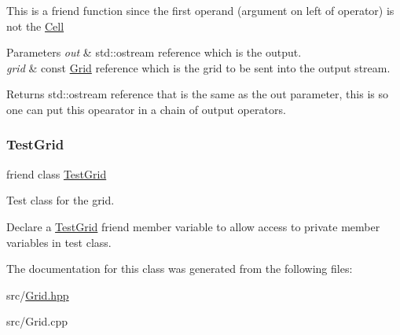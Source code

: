 This is a friend function since the first operand (argument on left of operator) is not the \hyperlink{class_cell}{Cell}


\begin{DoxyParams}{Parameters}
{\em out} & std\+::ostream reference which is the output. \\
\hline
{\em grid} & const \hyperlink{class_grid}{Grid} reference which is the grid to be sent into the output stream.\\
\hline
\end{DoxyParams}
\begin{DoxyReturn}{Returns}
std\+::ostream reference that is the same as the out parameter, this is so one can put this opearator in a chain of output operators. 
\end{DoxyReturn}
\mbox{\label{class_grid_ac2cfb15a02d10acf2c124625070a2de8}} 
\subsubsection{\texorpdfstring{Test\+Grid}{TestGrid}}
{\footnotesize\ttfamily friend class \hyperlink{class_test_grid}{Test\+Grid}\hspace{0.3cm}{\ttfamily [friend]}}



Test class for the grid. 

Declare a \hyperlink{class_test_grid}{Test\+Grid} friend member variable to allow access to private member variables in test class. 

The documentation for this class was generated from the following files\+:\begin{DoxyCompactItemize}
\item 
src/\hyperlink{_grid_8hpp}{Grid.\+hpp}\item 
src/Grid.\+cpp\end{DoxyCompactItemize}
